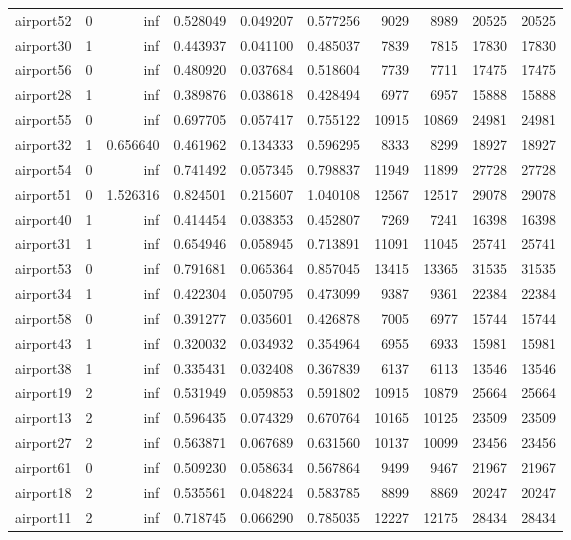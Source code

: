 \begin{longtable}{|l|r|r|r|r|r|r|r|r|r|}
airport52 & 0 & inf & 0.528049 & 0.049207 & 0.577256 & 9029 & 8989 & 20525 & 20525 \\
airport30 & 1 & inf & 0.443937 & 0.041100 & 0.485037 & 7839 & 7815 & 17830 & 17830 \\
airport56 & 0 & inf & 0.480920 & 0.037684 & 0.518604 & 7739 & 7711 & 17475 & 17475 \\
airport28 & 1 & inf & 0.389876 & 0.038618 & 0.428494 & 6977 & 6957 & 15888 & 15888 \\
airport55 & 0 & inf & 0.697705 & 0.057417 & 0.755122 & 10915 & 10869 & 24981 & 24981 \\
airport32 & 1 & 0.656640 & 0.461962 & 0.134333 & 0.596295 & 8333 & 8299 & 18927 & 18927 \\
airport54 & 0 & inf & 0.741492 & 0.057345 & 0.798837 & 11949 & 11899 & 27728 & 27728 \\
airport51 & 0 & 1.526316 & 0.824501 & 0.215607 & 1.040108 & 12567 & 12517 & 29078 & 29078 \\
airport40 & 1 & inf & 0.414454 & 0.038353 & 0.452807 & 7269 & 7241 & 16398 & 16398 \\
airport31 & 1 & inf & 0.654946 & 0.058945 & 0.713891 & 11091 & 11045 & 25741 & 25741 \\
airport53 & 0 & inf & 0.791681 & 0.065364 & 0.857045 & 13415 & 13365 & 31535 & 31535 \\
airport34 & 1 & inf & 0.422304 & 0.050795 & 0.473099 & 9387 & 9361 & 22384 & 22384 \\
airport58 & 0 & inf & 0.391277 & 0.035601 & 0.426878 & 7005 & 6977 & 15744 & 15744 \\
airport43 & 1 & inf & 0.320032 & 0.034932 & 0.354964 & 6955 & 6933 & 15981 & 15981 \\
airport38 & 1 & inf & 0.335431 & 0.032408 & 0.367839 & 6137 & 6113 & 13546 & 13546 \\
airport19 & 2 & inf & 0.531949 & 0.059853 & 0.591802 & 10915 & 10879 & 25664 & 25664 \\
airport13 & 2 & inf & 0.596435 & 0.074329 & 0.670764 & 10165 & 10125 & 23509 & 23509 \\
airport27 & 2 & inf & 0.563871 & 0.067689 & 0.631560 & 10137 & 10099 & 23456 & 23456 \\
airport61 & 0 & inf & 0.509230 & 0.058634 & 0.567864 & 9499 & 9467 & 21967 & 21967 \\
airport18 & 2 & inf & 0.535561 & 0.048224 & 0.583785 & 8899 & 8869 & 20247 & 20247 \\
airport11 & 2 & inf & 0.718745 & 0.066290 & 0.785035 & 12227 & 12175 & 28434 & 28434 \\

\end{longtable}
